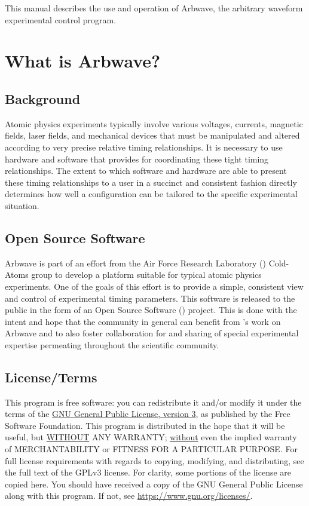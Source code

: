 \thispagestyle{fancy}
\pagestyle{fancy}

This manual describes the use and operation of Arbwave, the arbitrary waveform
experimental control program.

\section{What is Arbwave?}
\subsection{Background}
Atomic physics experiments typically involve various voltages, currents,
magnetic fields, laser fields, and mechanical devices that must be manipulated
and altered according to very precise relative timing relationships.  It is
necessary to use hardware and software that provides for coordinating these
tight timing relationships.  The extent to which software and hardware are
able to present these timing relationships to a user in a succinct and
consistent fashion directly determines how well a configuration can be
tailored to the specific experimental situation.

\subsection{Open Source Software}
Arbwave is part of an effort from the Air Force Research Laboratory
() Cold-Atoms group to develop a platform suitable for typical atomic
physics experiments.  One of the goals of this effort is to provide a simple,
consistent view and control of experimental timing parameters.  This software is
released to the public in the form of an Open Source Software ()
project.  This is done with the intent and hope that the community in general
can benefit from 's work on Arbwave and to also foster collaboration
for and sharing of special experimental expertise permeating throughout the
scientific community.

\subsection{License/Terms}
This program is free software: you can redistribute it and/or modify it under
the terms of the
\href{https://www.gnu.org/licenses/gpl-3.0.en.html}
{GNU General Public License, version 3}, as published by the Free
Software Foundation.  This program is distributed in the hope that it will be
useful, but \underline{WITHOUT} ANY WARRANTY; \underline{without} even the
implied warranty of MERCHANTABILITY or FITNESS FOR A PARTICULAR PURPOSE.  For
full license requirements with regards to copying, modifying, and distributing,
see the full text of the GPLv3 license.  For clarity, some portions of the
license are copied here.  You should have received a copy of the GNU General
Public License along with this program.  If not, see
\url{https://www.gnu.org/licenses/}.


